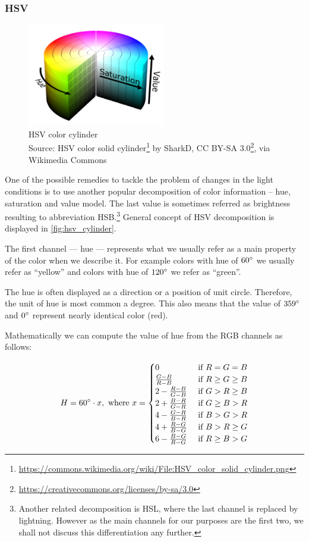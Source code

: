 \subsubsection{HSV}

\begin{figure}
    \centering
    \includegraphics[width=6cm]{img/HSV_color_solid_cylinder.png}
    \caption[HSV color cylinder]{HSV color cylinder\\Source: HSV color solid cylinder\footnote{\url{https://commons.wikimedia.org/wiki/File:HSV_color_solid_cylinder.png}} by SharkD, CC BY-SA 3.0\footnote{\url{https://creativecommons.org/licenses/by-sa/3.0}}, via Wikimedia Commons}
    \label{fig:hsv_cylinder}
\end{figure}

One of the possible remedies to tackle the problem of changes in the light
conditions is to use another popular decomposition of color information --
hue, saturation and value model. The last value is sometimes referred as
brightness resulting to abbreviation HSB.\footnote{Another related decomposition
is HSL, where the last channel is replaced by lightning. However as the main
channels for our purposes are the first two, we shall not discuss this
differentiation any further.} General concept of HSV decomposition is displayed
in \autoref{fig:hsv_cylinder}.

The first channel --- hue --- represents what we usually refer as a main
property of the color when we describe it. For example colors with hue of
$60\degree$ we usually refer as ``yellow'' and colors with hue of $120\degree$
we refer as ``green''.

The hue is often displayed as a direction or a position of unit circle.
Therefore, the unit of hue is most common a degree. This also means that
the value of $359\degree$ and $0\degree$ represent nearly identical color (red).

Mathematically we can compute the value of hue from the RGB channels as
follows:

$$H = 60\degree \cdot x, \text{ where } x = 
\begin{cases}
0 & \text{ if } R = G = B \\
\frac{G - B}{R - B} & \text{ if } R \geq G \geq B \\
2 - \frac{R - B}{G - B} & \text{ if } G > R \geq B \\
2 + \frac{B - R}{G - R} & \text{ if } G \geq B > R \\
4 - \frac{G - R}{B - R} & \text{ if } B > G > R \\
4 + \frac{R - G}{B - G} & \text{ if } B > R \geq G \\
6 - \frac{B - G}{R - G} & \text{ if } R \geq B > G
\end{cases}$$

